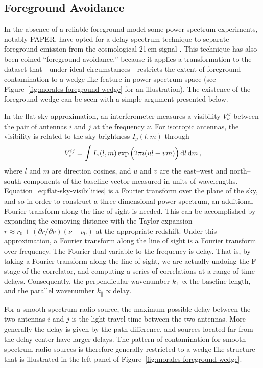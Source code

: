 \begin{bibunit}
\subsection{Foreground Avoidance}

In the absence of a reliable foreground model some power spectrum experiments, notably PAPER, have
opted for a delay-spectrum technique to separate foreground emission from the cosmological 21\,cm
signal \citep{2012ApJ...756..165P}. This technique has also been coined ``foreground avoidance,''
because it applies a transformation to the dataset that---under ideal circumstances---restricts the
extent of foreground contamination to a wedge-like feature in power spectrum space (see
Figure~\ref{fig:morales-foreground-wedge} for an illustration). The existence of the foreground
wedge can be seen with a simple argument presented below.

In the flat-sky approximation, an interferometer measures a visibility $V^{ij}_\nu$ between the
pair of antennas $i$ and $j$ at the frequency $\nu$. For isotropic antennas, the visibility is
related to the sky brightness $I_\nu(l, m)$ through
\begin{equation}\label{eq:flat-sky-visibilities}
    V^{ij}_\nu = \int I_\nu(l, m) \exp\Big(2\pi i (ul + vm)\Big)\,{\textrm d} l\,{\textrm d} m\,,
\end{equation}
where $l$ and $m$ are direction cosines, and $u$ and $v$ are the east--west and north--south
components of the baseline vector measured in units of wavelengths.
Equation~\ref{eq:flat-sky-visibilities} is a Fourier transform over the plane of the sky, and so in
order to construct a three-dimensional power spectrum, an additional Fourier transform along the
line of sight is needed. This can be accomplished by expanding the comoving distance with the Taylor
expansion $r \approx r_0 + (\partial r/\partial \nu)(\nu - \nu_0)$ at the appropriate redshift.
Under this approximation, a Fourier transform along the line of sight is a Fourier transform over
frequency.  The Fourier dual variable to the frequency is delay. That is, by taking a Fourier
transform along the line of sight, we are actually undoing the F stage of the correlator, and
computing a series of correlations at a range of time delays.  Consequently, the perpendicular
wavenumber $k_\perp \propto \text{the baseline length}$, and the parallel wavenumber $k_\parallel
\propto \text{delay}$.

For a smooth spectrum radio source, the maximum possible delay between the two antennas $i$ and $j$
is the light-travel time between the two antennas. More generally the delay is given by the path
difference, and sources located far from the delay center have larger delays. The pattern of
contamination for smooth spectrum radio sources is therefore generally restricted to a wedge-like
structure that is illustrated in the left panel of Figure~\ref{fig:morales-foreground-wedge}.


\end{bibunit}
